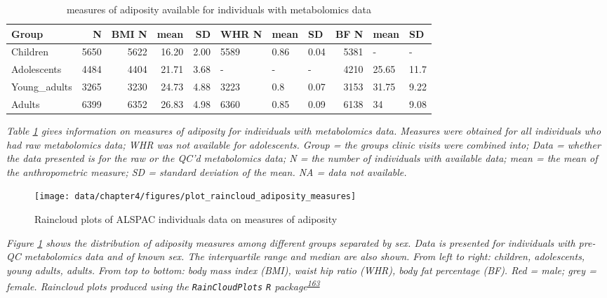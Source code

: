 \documentclass[11pt,twoside]{bristolthesis}
\newcommand{\blandscape}{\begin{landscape}}
\newcommand{\elandscape}{\end{landscape}}
\newcommand{\bsmall}{\begin{small}}
\newcommand{\esmall}{\end{small}}
\begin{document}
\blandscape
\begin{longtable}[t]{lrrrrlllrll}
\caption{\label{tab:chapter4-table-ALSPAC-adiposity}measures of adiposity available for individuals with metabolomics data}\\
\toprule
Group & N & BMI N & mean & SD & WHR N & mean & SD & BF N & mean & SD\\
\midrule
Children & 5650 & 5622 & 16.20 & 2.00 & 5589 & 0.86 & 0.04 & 5381 & - & -\\
Adolescents & 4484 & 4404 & 21.71 & 3.68 & - & - & - & 4210 & 25.65 & 11.7\\
Young\_adults & 3265 & 3230 & 24.73 & 4.88 & 3223 & 0.8 & 0.07 & 3153 & 31.75 & 9.22\\
Adults & 6399 & 6352 & 26.83 & 4.98 & 6360 & 0.85 & 0.09 & 6138 & 34 & 9.08\\
\bottomrule
\end{longtable}
\noindent 
\bsmall
\emph{Table \ref{tab:chapter4-table-ALSPAC-adiposity} gives information on measures of adiposity for individuals with metabolomics data. Measures were obtained for all individuals who had raw metabolomics data; WHR was not available for adolescents. Group = the groups clinic visits were combined into; Data = whether the data presented is for the raw or the QC'd metabolomics data; N = the number of individuals with available data; mean = the mean of the anthropometric measure; SD = standard deviation of the mean. NA = data not available.}
\esmall
\elandscape
\begin{figure}
\texttt{[image: data/chapter4/figures/plot\_raincloud\_adiposity\_measures]} \caption{Raincloud plots of ALSPAC individuals data on measures of adiposity}\label{fig:chapter4-figure-raincloudplot-adiposity-measures}
\end{figure}
\noindent 
\bsmall
\emph{Figure \ref{fig:chapter4-figure-raincloudplot-adiposity-measures} shows the distribution of adiposity measures among different groups separated by sex. Data is presented for individuals with pre-QC metabolomics data and of known sex. The interquartile range and median are also shown. From left to right: children, adolescents, young adults, adults. From top to bottom: body mass index (BMI), waist hip ratio (WHR), body fat percentage (BF). Red = male; grey = female. Raincloud plots produced using the \texttt{RainCloudPlots} \texttt{R} package\textsuperscript{\protect\hyperlink{ref-Allen2019}{163}}}
\esmall
\end{document}
